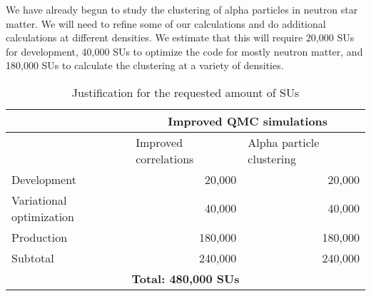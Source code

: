 \documentclass[12pt,letterpaper]{article}
\begin{document}
We have already begun to study the clustering of alpha particles in neutron star matter. We will need to refine some of our calculations and do additional calculations at different densities. We estimate that this will require 20,000 SUs for development, 40,000 SUs to optimize the code for mostly neutron matter, and 180,000 SUs to calculate the clustering at a variety of densities.

\begin{table}[htbp]
\centering
\caption{Justification for the requested amount of SUs}
\begin{tabular}{|l|r|r|}
\hline
 & \multicolumn{ 2}{c|}{\textbf{Improved QMC simulations}} \\ \hline
 & \multicolumn{1}{l|}{Improved correlations} &
 \multicolumn{1}{l|}{Alpha particle clustering} \\ \hline
Development & 20,000 & 20,000 \\ \hline
Variational optimization & 40,000 & 40,000 \\ \hline
Production & 180,000 & 180,000 \\ \hline
Subtotal & 240,000 & 240,000 \\ \hline\hline
\multicolumn{ 3}{|c|}{\textbf{Total: 480,000 SUs}} \\ \hline
\end{tabular}
\label{tab:SUs}
\end{table}

{\color{red}{Lucas depending on how many SU's we want to apply for and how many you need we can adjust the above estimates.}}

\vspace{-0.5cm}


\end{document}
